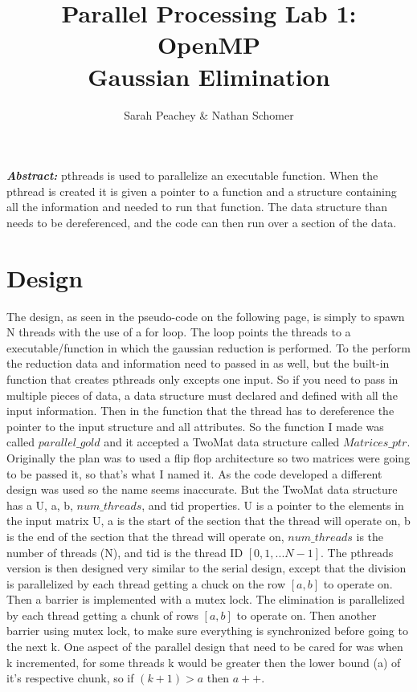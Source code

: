 \documentclass[12pt]{article}
\begin{document}
\title{Parallel Processing Lab 1: OpenMP \\ Gaussian Elimination}
\author{Sarah Peachey \& Nathan Schomer}
\maketitle

\textbf{\textit{Abstract:}} pthreads is used to parallelize an executable function. 
When the pthread is created it is given a pointer to a function and a structure containing 
all the information and needed to run that function. The data structure than needs to be 
dereferenced, and the code can then run over a section of the data. 

\newpage

\vspace{-1.5cm}
\section{Design}
\vspace{-0.25cm}
\qquad The design, as seen in the pseudo-code on the following page, is
simply to spawn N threads with the use of a for loop. The loop points the
threads to a executable/function in which the gaussian reduction is
performed. To the perform the reduction data and information need to passed
in as well, but the built-in function that creates pthreads only excepts one
input. So if you need to pass in multiple pieces of data, a data structure
must declared and defined with all the input information. Then in the
function that the thread has to dereference the pointer to the input
structure and all attributes. So the function I made was called
$parallel\_gold$ and it accepted a TwoMat data structure called
$Matrices\_ptr$.
Originally the plan was to used a flip flop architecture so two matrices
were going to be passed it, so that's what I named it. As the code developed
a different design was used so the name seems inaccurate. But the TwoMat
data structure has a U, a, b, $num\_threads$, and tid properties. U is a
pointer to the elements in the input matrix U, a is the start of the section
that the thread will operate on, b is the end of the section that the thread
will operate on, $num\_threads$ is the number of threads (N), and tid is the thread
ID $[0, 1, ... N-1]$. The pthreads version is then designed very similar to
the serial design, except that the division is parallelized by each thread
getting a chuck on the row $[a, b]$ to operate on. Then a barrier is
implemented with a mutex lock. The elimination is parallelized by each
thread getting a chunk of rows $[a, b]$ to operate on. Then another barrier
using mutex lock, to make sure everything is synchronized before going to the
next k. One aspect of the parallel design that need to be cared for was when
k incremented, for some threads k would be greater then the lower bound (a)
of it's respective chunk, so if $(k+1)>a$ then $a++$. 
\end{document}
